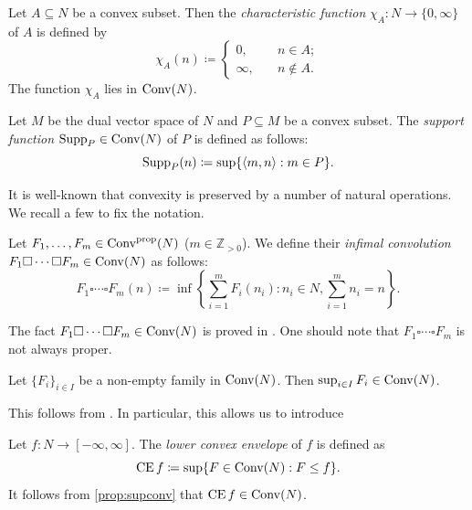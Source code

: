 \begin{example}\label{ex:charconvex}
    Let $A\subseteq N$ be a convex subset. Then the \emph{characteristic function} $\chi_A\colon N\rightarrow \{0,\infty\}$ of $A$ is defined by
    \[
    \chi_A(n)\coloneqq
    \left\{
    \begin{aligned}
        0,&\quad n\in A;\\
        \infty,&\quad n\not\in A.
    \end{aligned}
    \right.
    \]
    The function $\chi_A$ lies in $\mathrm{Conv}(N)$.
\end{example}

\begin{example}\label{ex:suppfun}
    Let $M$ be the dual vector space of $N$ and $P\subseteq M$ be a convex subset. The \emph{support function} $\operatorname{Supp}_P\in \mathrm{Conv}(N)$ of $P$ is defined as follows:
    \[
        \operatorname{Supp}_P(n)\coloneqq \sup\{ \langle m,n \rangle: m\in P \}.
    \]
\end{example}

It is well-known that convexity is preserved by a number of natural operations. We recall a few to fix the notation.

\begin{definition}\label{def:convex:L60}
    Let $F_1,\ldots,F_m\in \mathrm{Conv}^{\mathrm{prop}}(N)$ ($m\in \mathbb{Z}_{>0}$). We define their \emph{infimal convolution} $F_1 \square \cdots \square F_m\in \mathrm{Conv}(N)$ as follows:
    \[
    F_1 \square \cdots \square F_m(n)\coloneqq \inf\left\{ \sum_{i=1}^m F_i(n_i):n_i\in N, \sum_{i=1}^m n_i=n \right\}.
    \]
\end{definition}
The fact $F_1 \square \cdots \square F_m\in \mathrm{Conv}(N)$ is proved in \cite[Theorem~5.4]{Roc70}. One should note that $F_1 \square \cdots \square F_m$ is not always proper.

\begin{proposition}\label{prop:supconv}
    Let $\{F_i\}_{i\in I}$ be a non-empty family in $\mathrm{Conv}(N)$. Then $\sup_{i\in I} F_i\in \mathrm{Conv}(N)$.
\end{proposition}
This follows from \cite[Theorem~5.5]{Roc70}. In particular, this allows us to introduce
\begin{definition}\label{def:LCE}
    Let $f\colon N\rightarrow [-\infty,\infty]$. The \emph{lower convex envelope}\index{$\LCE$} of $f$ is defined as
    \[
    \operatorname{CE} f\coloneqq \sup\{F\in \mathrm{Conv}(N): F\leq f \}.
    \]
    It follows from \cref{prop:supconv} that $\operatorname{CE} f\in \mathrm{Conv}(N)$.
\end{definition}



